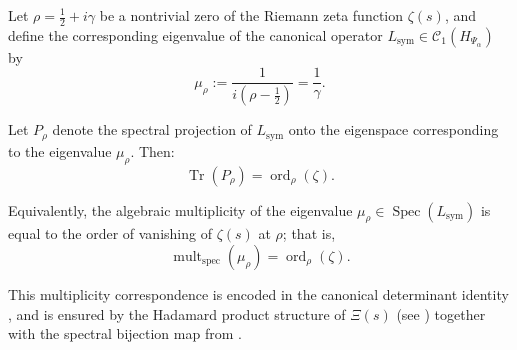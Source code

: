 \begin{lemma}
\label{lem:spectral_multiplicity_matching}
Let \( \rho = \tfrac{1}{2} + i\gamma \) be a nontrivial zero of the Riemann zeta function \( \zeta(s) \), and define the corresponding eigenvalue of the canonical operator \( L_{\mathrm{sym}} \in \mathcal{C}_1(H_{\Psi_\alpha}) \) by
\[
\mu_\rho := \frac{1}{i(\rho - \tfrac{1}{2})} = \frac{1}{\gamma}.
\]

Let \( P_\rho \) denote the spectral projection of \( L_{\mathrm{sym}} \) onto the eigenspace corresponding to the eigenvalue \( \mu_\rho \). Then:
\[
\operatorname{Tr}(P_\rho) = \operatorname{ord}_\rho(\zeta).
\]

Equivalently, the algebraic multiplicity of the eigenvalue \( \mu_\rho \in \operatorname{Spec}(L_{\mathrm{sym}}) \) is equal to the order of vanishing of \( \zeta(s) \) at \( \rho \); that is,
\[
\operatorname{mult}_{\mathrm{spec}}(\mu_\rho) = \operatorname{ord}_\rho(\zeta).
\]

\medskip
\noindent
This multiplicity correspondence is encoded in the canonical determinant identity , and is ensured by the Hadamard product structure of \( \Xi(s) \) (see ) together with the spectral bijection map from .
\end{lemma}
